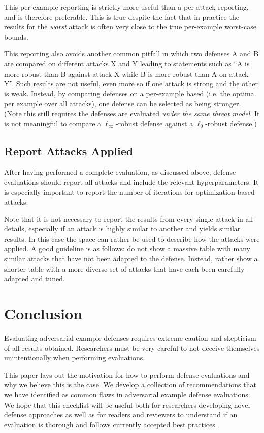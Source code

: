 \documentclass{article} %
\begin{document}
This per-example reporting is strictly more useful than a per-attack reporting,
and is therefore preferable.
%
This is true despite the fact that in practice the results for the \emph{worst} attack
is often very close to the true per-example worst-case bounds.


This reporting also avoids another common pitfall in which two defenses A and B are compared
on different attacks X and Y leading to statements such as ``A is more robust than B against attack X
while B is more robust than A on attack Y''.
%
Such results are not useful, even more so if one attack
is strong and the other is weak.
%
Instead, by comparing defenses on
a per-example based (i.e. the optima per example over all attacks),
one defense can be selected as being stronger.
%
(Note this still requires the defenses are evaluated \emph{under the same threat model}.
%
It is not meaningful to compare a $\ell_\infty$-robust defense against a $\ell_0$-robust
defense.)

\subsection{Report Attacks Applied}
\label{sec:describeattacks}
After having performed a complete evaluation, as discussed above, defense
evaluations should report all attacks and
include the relevant hyperparameters.
%
It is especially important to report the number of iterations for optimization-based
attacks.

Note that it is not necessary to report the results from every
single attack in all details, especially if 
an attack is highly similar to another and yields similar results.
%
In this case the space can
rather be used to describe how the attacks were applied.
%
A good guideline is as follows: do
not show a massive table with many similar attacks that
have not been adapted to the defense.
%
Instead, rather show a shorter table with a more
diverse set of attacks that have each been
carefully adapted and tuned.


\section{Conclusion}

Evaluating adversarial example defenses requires extreme caution
and skepticism of all results obtained.
%
Researchers must be very careful
to not deceive themselves unintentionally when performing
evaluations.

This paper lays out the motivation for how to perform defense evaluations
and why we believe this is the case.
%
We develop a collection of recommendations
that we have identified as common flaws in adversarial
example defense evaluations.
%
We hope that this checklist will be
useful both for researchers developing novel defense approaches as
well as for readers and reviewers to understand if an evaluation is thorough
and follows currently accepted best practices.
%
\end{document}
